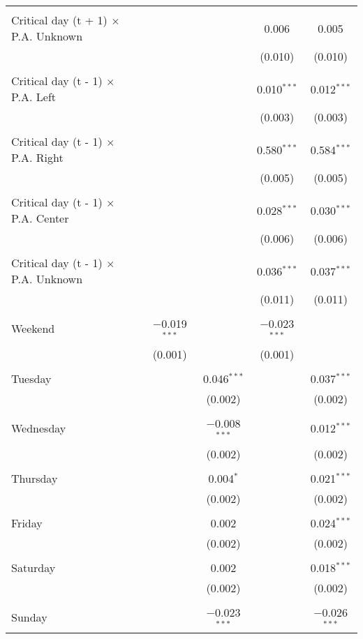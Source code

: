 \documentclass[
]{article}
\begin{document}
\begin{table}[!htbp]
{\begin{tabular}{@{\extracolsep{5pt}}lcccc}
  & & & & \\ 
 Critical day (t + 1) $\times$ P.A. Unknown &  &  & 0.006 & 0.005 \\ 
  &  &  & (0.010) & (0.010) \\ 
  & & & & \\ 
 Critical day (t - 1) $\times$ P.A. Left &  &  & 0.010$^{***}$ & 0.012$^{***}$ \\ 
  &  &  & (0.003) & (0.003) \\ 
  & & & & \\ 
 Critical day (t - 1) $\times$ P.A. Right &  &  & 0.580$^{***}$ & 0.584$^{***}$ \\ 
  &  &  & (0.005) & (0.005) \\ 
  & & & & \\ 
 Critical day (t - 1) $\times$ P.A. Center &  &  & 0.028$^{***}$ & 0.030$^{***}$ \\ 
  &  &  & (0.006) & (0.006) \\ 
  & & & & \\ 
 Critical day (t - 1) $\times$ P.A. Unknown &  &  & 0.036$^{***}$ & 0.037$^{***}$ \\ 
  &  &  & (0.011) & (0.011) \\ 
  & & & & \\ 
 Weekend & $-$0.019$^{***}$ &  & $-$0.023$^{***}$ &  \\ 
  & (0.001) &  & (0.001) &  \\ 
  & & & & \\ 
 Tuesday &  & 0.046$^{***}$ &  & 0.037$^{***}$ \\ 
  &  & (0.002) &  & (0.002) \\ 
  & & & & \\ 
 Wednesday &  & $-$0.008$^{***}$ &  & 0.012$^{***}$ \\ 
  &  & (0.002) &  & (0.002) \\ 
  & & & & \\ 
 Thursday &  & 0.004$^{*}$ &  & 0.021$^{***}$ \\ 
  &  & (0.002) &  & (0.002) \\ 
  & & & & \\ 
 Friday &  & 0.002 &  & 0.024$^{***}$ \\ 
  &  & (0.002) &  & (0.002) \\ 
  & & & & \\ 
 Saturday &  & 0.002 &  & 0.018$^{***}$ \\ 
  &  & (0.002) &  & (0.002) \\ 
  & & & & \\ 
 Sunday &  & $-$0.023$^{***}$ &  & $-$0.026$^{***}$ \\ 

\end{tabular}}
\end{table}
\end{document}
